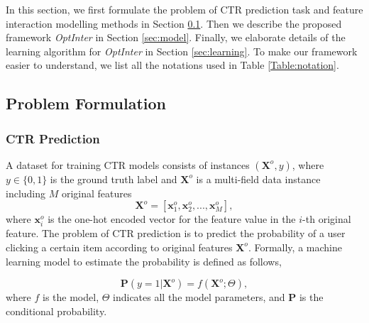 \documentclass[conference]{IEEEtran}
\begin{document}
In this section, we first formulate the problem of CTR prediction task and feature interaction modelling methods in Section \ref{sec:problem}. Then we describe the proposed framework \textit{OptInter} in Section \ref{sec:model}. Finally, we elaborate details of the learning algorithm for \textit{OptInter} in Section \ref{sec:learning}. To make our framework easier to understand, we list all the notations used in Table \ref{Table:notation}.

\subsection{Problem Formulation}
\label{sec:problem}

\subsubsection{CTR Prediction}
A dataset for training CTR models consists of instances $(\mathbf{X}^{o},y)$, where $y \in \{0,1\}$ is the ground truth label and $\mathbf{X}^{o}$ is a multi-field data instance including $M$ original features
\begin{equation}
    \mathbf{X}^{o} = [\mathbf{x}^{o}_{1}, \mathbf{x}^{o}_{2}, ..., \mathbf{x}^{o}_{M}],
\end{equation}
where $\mathbf{x}^{o}_i$ is the one-hot encoded vector for the feature value in the $i$-th original feature. The problem of CTR prediction is to predict the probability of a user clicking a certain item according to original features $\mathbf{X}^{o}$. Formally, a machine learning model to estimate the probability is defined as follows,

\begin{equation}
    \mathbf{P}(y=1 | \mathbf{X}^o) = f(\mathbf{X}^o;\Theta),
    \label{eq:form}
\end{equation}
where $f$ is the model, ${\Theta}$ indicates all the model parameters, and $\mathbf{P}$ is the conditional probability.
\end{document}
